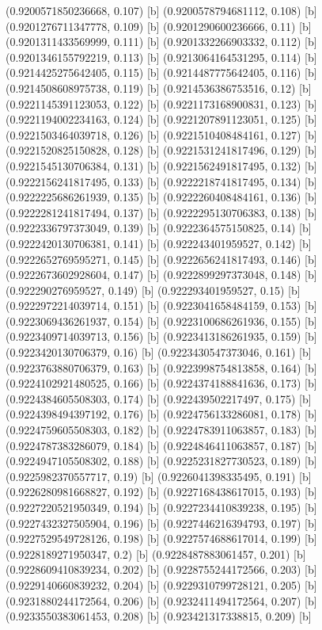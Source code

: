 {{{(0.9200571850236668, 0.107) [b] 
(0.9200578794681112, 0.108) [b] 
(0.9201276711347778, 0.109) [b] 
(0.9201290600236666, 0.11) [b] 
(0.9201311433569999, 0.111) [b] 
(0.9201332266903332, 0.112) [b] 
(0.9201346155792219, 0.113) [b] 
(0.9213064164531295, 0.114) [b] 
(0.9214425275642405, 0.115) [b] 
(0.9214487775642405, 0.116) [b] 
(0.9214508608975738, 0.119) [b] 
(0.9214536386753516, 0.12) [b] 
(0.9221145391123053, 0.122) [b] 
(0.9221173168900831, 0.123) [b] 
(0.9221194002234163, 0.124) [b] 
(0.9221207891123051, 0.125) [b] 
(0.9221503464039718, 0.126) [b] 
(0.9221510408484161, 0.127) [b] 
(0.9221520825150828, 0.128) [b] 
(0.9221531241817496, 0.129) [b] 
(0.9221545130706384, 0.131) [b] 
(0.9221562491817495, 0.132) [b] 
(0.9222156241817495, 0.133) [b] 
(0.9222218741817495, 0.134) [b] 
(0.9222225686261939, 0.135) [b] 
(0.9222260408484161, 0.136) [b] 
(0.9222281241817494, 0.137) [b] 
(0.9222295130706383, 0.138) [b] 
(0.9222336797373049, 0.139) [b] 
(0.9222364575150825, 0.14) [b] 
(0.9222420130706381, 0.141) [b] 
(0.922243401959527, 0.142) [b] 
(0.9222652769595271, 0.145) [b] 
(0.9222656241817493, 0.146) [b] 
(0.9222673602928604, 0.147) [b] 
(0.9222899297373048, 0.148) [b] 
(0.922290276959527, 0.149) [b] 
(0.922293401959527, 0.15) [b] 
(0.9222972214039714, 0.151) [b] 
(0.9223041658484159, 0.153) [b] 
(0.9223069436261937, 0.154) [b] 
(0.9223100686261936, 0.155) [b] 
(0.9223409714039713, 0.156) [b] 
(0.9223413186261935, 0.159) [b] 
(0.9223420130706379, 0.16) [b] 
(0.9223430547373046, 0.161) [b] 
(0.9223763880706379, 0.163) [b] 
(0.9223998754813858, 0.164) [b] 
(0.9224102921480525, 0.166) [b] 
(0.9224374188841636, 0.173) [b] 
(0.9224384605508303, 0.174) [b] 
(0.922439502217497, 0.175) [b] 
(0.9224398494397192, 0.176) [b] 
(0.9224756133286081, 0.178) [b] 
(0.9224759605508303, 0.182) [b] 
(0.9224783911063857, 0.183) [b] 
(0.9224787383286079, 0.184) [b] 
(0.9224846411063857, 0.187) [b] 
(0.9224947105508302, 0.188) [b] 
(0.9225231827730523, 0.189) [b] 
(0.9225982370557717, 0.19) [b] 
(0.9226041398335495, 0.191) [b] 
(0.9226280981668827, 0.192) [b] 
(0.9227168438617015, 0.193) [b] 
(0.9227220521950349, 0.194) [b] 
(0.9227234410839238, 0.195) [b] 
(0.9227432327505904, 0.196) [b] 
(0.9227446216394793, 0.197) [b] 
(0.9227529549728126, 0.198) [b] 
(0.9227574688617014, 0.199) [b] 
(0.9228189271950347, 0.2) [b] 
(0.9228487883061457, 0.201) [b] 
(0.9228609410839234, 0.202) [b] 
(0.9228755244172566, 0.203) [b] 
(0.9229140660839232, 0.204) [b] 
(0.9229310799728121, 0.205) [b] 
(0.9231880244172564, 0.206) [b] 
(0.9232411494172564, 0.207) [b] 
(0.9233550383061453, 0.208) [b] 
(0.923421317338815, 0.209) [b] 
}}}
